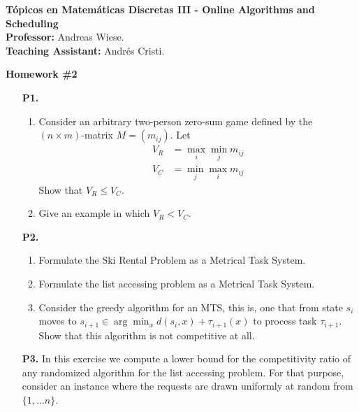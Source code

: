 \documentclass[11pt, spanish]{article}
\theoremstyle{plain}
\begin{document}

\begin{flushleft}
  \textbf{Tópicos en Matemáticas Discretas III - Online Algorithms and Scheduling}
  \\\textbf{Professor:} Andreas Wiese.
  \\\textbf{Teaching Assistant:} Andrés Cristi.
\end{flushleft}


\begin{center}
  \Large{\textbf{Homework \#2}}
\end{center}




\begin{itemize}
  \item[\textbf{P1.}]
    \begin{enumerate}
      \item Consider an arbitrary two-person zero-sum game
    	defined by the $(n\times m)$-matrix $M = (m_{ij})$. Let
    	\begin{align*}
      		V_R &= \max_i \min_j m_{ij} \\
      		V_C &= \min_j \max_i m_{ij}
    	\end{align*}
	Show that $V_R\leq V_C$.
      \item Give an example in which $V_R< V_C$.

    \end{enumerate}
    


\item[\textbf{P2.}] 
  \begin{enumerate}
    \item Formulate the Ski Rental Problem as a Metrical Task System.
    \item Formulate the list accessing problem as a Metrical Task System.
    \item Consider the greedy algorithm for an MTS, this is, one that
      from state $s_i$ moves to $s_{i+1}\in \arg\min_x d(s_i,x) + \tau_{i+1}(x)$
      to process task $\tau_{i+1}$. Show that this algorithm is not
      competitive at all.
  \end{enumerate}
  
  \item[\textbf{P3.}]  In this exercise we compute a lower bound for
    the competitivity ratio of any randomized algorithm for the list
    accessing problem. For that purpose, consider an instance where
    the requests are drawn uniformly at random from $\{1,\dots n\}$.
    

\end{itemize}
\end{document}
